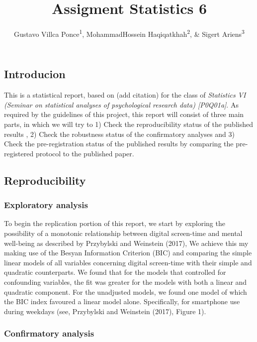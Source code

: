 \documentclass[man]{apa6}
\title{Assigment Statistics 6}
\author{Gustavo Villca Ponce\textsuperscript{1}, MohammadHossein Haqiqatkhah\textsuperscript{2}, \& Sigert Ariens\textsuperscript{3}}
\affiliation{
    \vspace{0.5cm}
          \textsuperscript{1} r0292033\\
          \textsuperscript{2} r0607671\\
          \textsuperscript{3} r0446864\\
          \textsuperscript{} Faculty of Psychology and Educational Sciences, KU Leuven.  }
\theoremstyle{definition}
\theoremstyle{definition}
\theoremstyle{definition}
\theoremstyle{remark}
\begin{document}
\maketitle

\setcounter{secnumdepth}{0}



\hypertarget{introducion}{%
\subsection{Introducion}\label{introducion}}

This is a statistical report, based on (add citation) for the class of
\emph{Statistics VI (Seminar on statistical analyses of psychological
research data) {[}P0Q01a{]}}. As required by the guidelines of this
project, this report will consist of three main parts, in which we will
try to 1) Check the reproducibility status of the published results , 2)
Check the robustness status of the confirmatory analyses and 3) Check
the pre-registration status of the published results by comparing the
pre-registered protocol to the published paper.

\hypertarget{reproducibility}{%
\subsection{Reproducibility}\label{reproducibility}}

\hypertarget{exploratory-analysis}{%
\subsubsection{Exploratory analysis}\label{exploratory-analysis}}

To begin the replication portion of this report, we start by exploring
the possibility of a monotonic relationship between digital screen-time
and mental well-being as described by Przybylski and Weinstein (2017),
We achieve this my making use of the Besyan Information Criterion (BIC)
and comparing the simple linear models of all variables concerning
digital screen-time with their simple and quadratic counterparts. We
found that for the models that controlled for confounding variables, the
fit was greater for the models with both a linear and quadratic
component. For the unadjusted models, we found one model of which the
BIC index favoured a linear model alone. Specifically, for smartphone
use during weekdays (see, Przybylski and Weinstein (2017), Figure 1).

\hypertarget{confirmatory-analysis}{%
\subsubsection{Confirmatory analysis}\label{confirmatory-analysis}}
\end{document}
